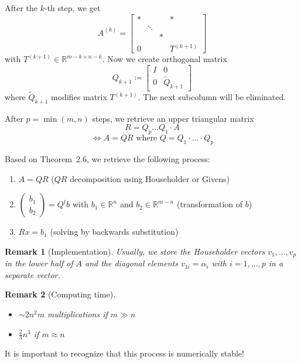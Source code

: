 \documentclass[a4paper]{article}
\numberwithin{lecref}{section}
\theoremstyle{break}
\newtheorem*{Remark}{Remark}
\begin{document}
After the $k$-th step, we get
\[ A^{(k)} = \begin{bmatrix} * & & & * \\ & \ddots & & \\ & & * & \\ 0 & & & T^{(k+1)} \end{bmatrix} \]
with $T^{(k+1)} \in \mathbb R^{m-k \times n-k}$. Now we create orthogonal matrix
\[ Q_{k+1} \coloneqq \begin{bmatrix} I & 0 \\ 0 & \tilde Q_{k+1} \end{bmatrix} \]
where $\tilde Q_{k+1}$ modifies matrix $T^{(k+1)}$. The next subcolumn will be eliminated.

After $p = \min(m,n)$ steps, we retrieve an upper triangular matrix
\[ R = Q_p \dots Q_1 \cdot A \]
\[ \iff A = QR \text{ where } Q = Q_1 \cdot \dots \cdot Q_p \]

Based on Theorem~2.6, we retrieve the following process:
\begin{enumerate}
  \item $A = QR$ ($QR$ decomposition using Householder or Givens)
  \item $\begin{pmatrix} b_1 \\ b_2 \end{pmatrix} = Q^t b$ with $b_1 \in \mathbb R^n$ and $b_2 \in \mathbb R^{m-n}$ (transformation of $b$)
  \item $Rx = b_1$ (solving by backwards substitution)
\end{enumerate}

\begin{Remark}[Implementation]
  Usually, we store the Householder vectors $v_1, \dots, v_p$ in the lower half of $A$ and the diagonal elements $v_{1i} = \alpha_i$ with $i = 1,\dots,p$ in a separate vector.
\end{Remark}

\begin{Remark}[Computing time]\hfill{}
  \begin{itemize}
    \item $\sim 2n^2m$ multiplications if $m \gg n$
    \item $\frac23 n^3$ if $m \approx n$
  \end{itemize}
\end{Remark}

It is important to recognize that this process is numerically stable!
\end{document}
